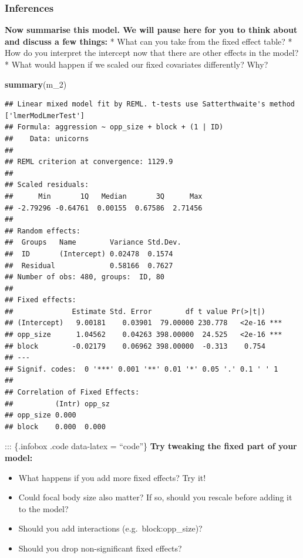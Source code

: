 \documentclass[
  12pt,
]{book}
\newenvironment{Shaded}{\begin{snugshade}}{\end{snugshade}}
\newcommand{\DecValTok}[1]{\textcolor[rgb]{0.00,0.00,0.81}{#1}}
\newcommand{\KeywordTok}[1]{\textcolor[rgb]{0.13,0.29,0.53}{\textbf{#1}}}
\newcommand{\NormalTok}[1]{#1}
\providecommand{\tightlist}{%
  \setlength{\itemsep}{0pt}\setlength{\parskip}{0pt}}
\begin{document}
\hypertarget{inferences}{%
\subsubsection{Inferences}\label{inferences}}

\textbf{Now summarise this model. We will pause here for you to think about and discuss a few things:}
* What can you take from the fixed effect table?
* How do you interpret the intercept now that there are other effects in the model?
* What would happen if we scaled our fixed covariates differently? Why?

\begin{Shaded}
\begin{Highlighting}[]
\KeywordTok{summary}\NormalTok{(m\_}\DecValTok{2}\NormalTok{)}
\end{Highlighting}
\end{Shaded}

\begin{verbatim}
## Linear mixed model fit by REML. t-tests use Satterthwaite's method ['lmerModLmerTest']
## Formula: aggression ~ opp_size + block + (1 | ID)
##    Data: unicorns
## 
## REML criterion at convergence: 1129.9
## 
## Scaled residuals: 
##      Min       1Q   Median       3Q      Max 
## -2.79296 -0.64761  0.00155  0.67586  2.71456 
## 
## Random effects:
##  Groups   Name        Variance Std.Dev.
##  ID       (Intercept) 0.02478  0.1574  
##  Residual             0.58166  0.7627  
## Number of obs: 480, groups:  ID, 80
## 
## Fixed effects:
##              Estimate Std. Error        df t value Pr(>|t|)    
## (Intercept)   9.00181    0.03901  79.00000 230.778   <2e-16 ***
## opp_size      1.04562    0.04263 398.00000  24.525   <2e-16 ***
## block        -0.02179    0.06962 398.00000  -0.313    0.754    
## ---
## Signif. codes:  0 '***' 0.001 '**' 0.01 '*' 0.05 '.' 0.1 ' ' 1
## 
## Correlation of Fixed Effects:
##          (Intr) opp_sz
## opp_size 0.000        
## block    0.000  0.000
\end{verbatim}

::: \{.infobox .code data-latex = ``code''\}
\textbf{Try tweaking the fixed part of your model:}

\begin{itemize}
\tightlist
\item
  What happens if you add more fixed effects? Try it!
\item
  Could focal body size also matter? If so, should you rescale before adding it to the model?
\item
  Should you add interactions (e.g.~block:opp\_size)?
\item
  Should you drop non-significant fixed effects?
\end{itemize}
\end{document}
